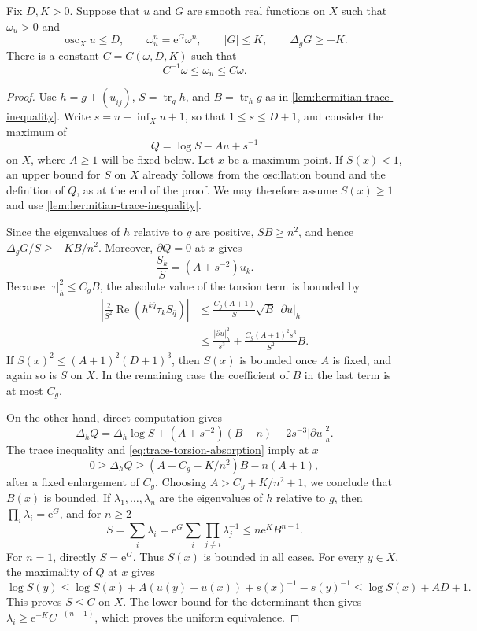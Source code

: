 \begin{theorem}\label{thm:hermitian-second-estimate}
Fix $D,K>0$. Suppose that $u$ and $G$ are smooth real functions on $X$ such that $\omega_u>0$ and
\[
 \operatorname{osc}_Xu\leq D,\qquad
 \omega_u^n=\mathrm{e}^G\omega^n,\qquad
 |G|\leq K,\qquad \Delta_gG\geq-K.
\]
There is a constant $C=C(\omega,D,K)$ such that
\[
 C^{-1}\omega\leq\omega_u\leq C\omega.
\]
\end{theorem}
\begin{proof}
Use $h=g+(u_{i\bar j})$, $S=\operatorname{tr}_g h$, and $B=\operatorname{tr}_h g$ as in \cref{lem:hermitian-trace-inequality}. Write $s=u-\inf_Xu+1$, so that $1\leq s\leq D+1$, and consider the maximum of
\[
 Q=\log S-Au+s^{-1}
\]
on $X$, where $A\geq1$ will be fixed below. Let $x$ be a maximum point. If $S(x)<1$, an upper bound for $S$ on $X$ already follows from the oscillation bound and the definition of $Q$, as at the end of the proof. We may therefore assume $S(x)\geq1$ and use \cref{lem:hermitian-trace-inequality}.

Since the eigenvalues of $h$ relative to $g$ are positive, $SB\geq n^2$, and hence $\Delta_gG/S\geq-KB/n^2$. Moreover, $\partial Q=0$ at $x$ gives
\[
 \frac{S_k}{S}=(A+s^{-2})u_k.
\]
Because $|\tau|_h^2\leq C_gB$, the absolute value of the torsion term is bounded by
\begin{equation}\label{eq:trace-torsion-absorption}
 \begin{split}
 \left|\frac2{S^2}\operatorname{Re}(h^{k\bar q}\tau_kS_{\bar q})\right|
 &\leq\frac{C_g(A+1)}S\sqrt B\,|\partial u|_h\\
 &\leq\frac{|\partial u|_h^2}{s^3}
          +\frac{C_g(A+1)^2s^3}{S^2}B.
 \end{split}
\end{equation}
If $S(x)^2\leq(A+1)^2(D+1)^3$, then $S(x)$ is bounded once $A$ is fixed, and again so is $S$ on $X$. In the remaining case the coefficient of $B$ in the last term is at most $C_g$.

On the other hand, direct computation gives
\[
 \Delta_hQ=\Delta_h\log S+(A+s^{-2})(B-n)
                         +2s^{-3}|\partial u|_h^2.
\]
The trace inequality and \eqref{eq:trace-torsion-absorption} imply at $x$
\[
 0\geq\Delta_hQ\geq(A-C_g-K/n^2)B-n(A+1),
\]
after a fixed enlargement of $C_g$. Choosing $A>C_g+K/n^2+1$, we conclude that $B(x)$ is bounded. If $\lambda_1,\ldots,\lambda_n$ are the eigenvalues of $h$ relative to $g$, then $\prod_i\lambda_i=\mathrm{e}^G$, and for $n\geq2$
\[
 S=\sum_i\lambda_i
 =\mathrm{e}^G\sum_i\prod_{j\ne i}\lambda_j^{-1}
 \leq n \mathrm{e}^K B^{n-1}.
\]
For $n=1$, directly $S=\mathrm{e}^G$. Thus $S(x)$ is bounded in all cases. For every $y\in X$, the maximality of $Q$ at $x$ gives
\[
 \log S(y)\leq\log S(x)+A(u(y)-u(x))+s(x)^{-1}-s(y)^{-1}
             \leq\log S(x)+AD+1.
\]
This proves $S\leq C$ on $X$. The lower bound for the determinant then gives
$\lambda_i\geq \mathrm{e}^{-K}C^{-(n-1)}$, which proves the uniform equivalence.
\end{proof}

